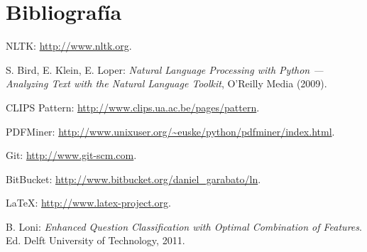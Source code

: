 \documentclass[12pt,a4paper,titlepage]{article}
\begin{document}
\clearpage
\section{Bibliografía}
\begin{thebibliography}{99}

NLTK: \url{http://www.nltk.org}.

S. Bird, E. Klein, E. Loper: \emph{Natural Language Processing with Python --- Analyzing Text with the Natural Language Toolkit}, O'Reilly Media (2009).

CLIPS Pattern: \url{http://www.clips.ua.ac.be/pages/pattern}.

PDFMiner: \url{http://www.unixuser.org/~euske/python/pdfminer/index.html}.

Git: \url{http://www.git-scm.com}.

BitBucket: \url{http://www.bitbucket.org/daniel_garabato/ln}.

\LaTeX: \url{http://www.latex-project.org}.

B. Loni: \emph{Enhanced Question Classification with Optimal Combination of Features}. Ed. Delft University of Technology, 2011.

\end{thebibliography}
\end{document}
